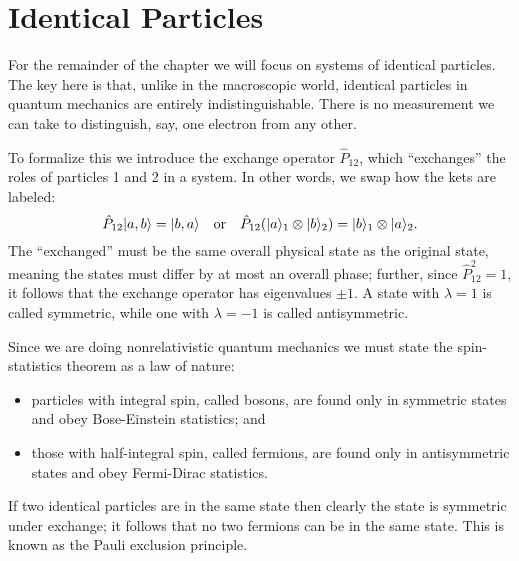 \documentclass[../p116main.tex]{subfiles}
\begin{document}
\section{Identical Particles}
For the remainder of the chapter we will focus on systems of identical particles.
The key here is that, unlike in the macroscopic world, identical particles in quantum mechanics are entirely indistinguishable.
There is no measurement we can take to distinguish, say, one electron from any other.

To formalize this we introduce the exchange operator $\hat P_{12}$, which ``exchanges'' the roles of particles 1 and 2 in a system.
In other words, we swap how the kets are labeled:
\[ \hat P_{12} |{a,b}\rangle = |{b,a}\rangle \quad\text{or}\quad \hat P_{12} (|{a}\rangle_1 \otimes |{b}\rangle_2) = |{b}\rangle_1 \otimes |{a}\rangle_2. \]
The ``exchanged'' must be the same overall physical state as the original state, meaning the states must differ by at most an overall phase; further, since $\hat P_{12}^2 = 1$, it follows that the exchange operator has eigenvalues $\pm 1$.
A state with $\lambda = 1$ is called symmetric, while one with $\lambda = -1$ is called antisymmetric.

Since we are doing nonrelativistic quantum mechanics we must state the spin-statistics theorem as a law of nature:
\begin{itemize}[topsep=0pt]
    \item particles with integral spin, called bosons, are found only in symmetric states and obey Bose-Einstein statistics; and
    \item those with half-integral spin, called fermions, are found only in antisymmetric states and obey Fermi-Dirac statistics.
\end{itemize}
If two identical particles are in the same state then clearly the state is symmetric under exchange; it follows that no two fermions can be in the same state.
This is known as the Pauli exclusion principle.
\end{document}
